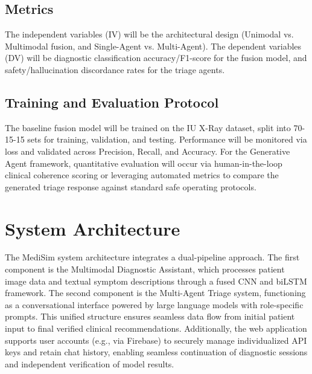 \documentclass[11pt,a4paper]{article}
\begin{document}
\subsection{Metrics}
The independent variables (IV) will be the architectural design (Unimodal vs. Multimodal fusion, and Single-Agent vs. Multi-Agent). The dependent variables (DV) will be diagnostic classification accuracy/F1-score for the fusion model, and safety/hallucination discordance rates for the triage agents.

\subsection{Training and Evaluation Protocol}
The baseline fusion model will be trained on the IU X-Ray dataset, split into 70-15-15 sets for training, validation, and testing. Performance will be monitored via loss and validated across Precision, Recall, and Accuracy. For the Generative Agent framework, quantitative evaluation will occur via human-in-the-loop clinical coherence scoring or leveraging automated metrics to compare the generated triage response against standard safe operating protocols.

\begin{table}[h]
\centering
{}
\caption{Performance comparison between baseline architectures and the proposed MediSim components.}
\label{tab:performance_comparison}
\end{table}

\section{System Architecture}

The MediSim system architecture integrates a dual-pipeline approach. The first component is the Multimodal Diagnostic Assistant, which processes patient image data and textual symptom descriptions through a fused CNN and biLSTM framework. The second component is the Multi-Agent Triage system, functioning as a conversational interface powered by large language models with role-specific prompts. This unified structure ensures seamless data flow from initial patient input to final verified clinical recommendations. Additionally, the web application supports user accounts (e.g., via Firebase) to securely manage individualized API keys and retain chat history, enabling seamless continuation of diagnostic sessions and independent verification of model results.
\end{document}
